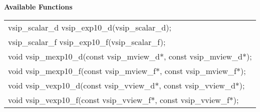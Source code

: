 \\\cvsiplh
\\ \hspace*{.8cm} \vspace*{.1cm} \textbf{Available Functions }
\\ \hspace*{1.1cm} {
\ttfamily
\begin{tabular}[H]{l}
vsip\_scalar\_d vsip\_exp10\_d(vsip\_scalar\_d);\\
vsip\_scalar\_f vsip\_exp10\_f(vsip\_scalar\_f);\\
void vsip\_mexp10\_d(const vsip\_mview\_d*, const vsip\_mview\_d*);\\
void vsip\_mexp10\_f(const vsip\_mview\_f*, const vsip\_mview\_f*);\\
void vsip\_vexp10\_d(const vsip\_vview\_d*, const vsip\_vview\_d*);\\
void vsip\_vexp10\_f(const vsip\_vview\_f*, const vsip\_vview\_f*);\\
\end{tabular}
}
\\\pyjvsiph
{}
